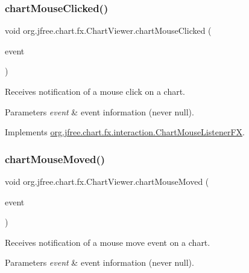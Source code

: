 \subsubsection{\texorpdfstring{chart\+Mouse\+Clicked()}{chartMouseClicked()}}
{\footnotesize\ttfamily void org.\+jfree.\+chart.\+fx.\+Chart\+Viewer.\+chart\+Mouse\+Clicked (\begin{DoxyParamCaption}\item[{\mbox{\hyperlink{classorg_1_1jfree_1_1chart_1_1fx_1_1interaction_1_1_chart_mouse_event_f_x}{Chart\+Mouse\+Event\+FX}}}]{event }\end{DoxyParamCaption})}

Receives notification of a mouse click on a chart.


\begin{DoxyParams}{Parameters}
{\em event} & event information (never {\ttfamily null}). \\
\hline
\end{DoxyParams}


Implements \mbox{\hyperlink{interfaceorg_1_1jfree_1_1chart_1_1fx_1_1interaction_1_1_chart_mouse_listener_f_x_a7953c88563d5cd432d8232f3ade82403}{org.\+jfree.\+chart.\+fx.\+interaction.\+Chart\+Mouse\+Listener\+FX}}.

\mbox{\label{classorg_1_1jfree_1_1chart_1_1fx_1_1_chart_viewer_ad9cb6ad74904822db234d14c8356c05d}} 
\subsubsection{\texorpdfstring{chart\+Mouse\+Moved()}{chartMouseMoved()}}
{\footnotesize\ttfamily void org.\+jfree.\+chart.\+fx.\+Chart\+Viewer.\+chart\+Mouse\+Moved (\begin{DoxyParamCaption}\item[{\mbox{\hyperlink{classorg_1_1jfree_1_1chart_1_1fx_1_1interaction_1_1_chart_mouse_event_f_x}{Chart\+Mouse\+Event\+FX}}}]{event }\end{DoxyParamCaption})}

Receives notification of a mouse move event on a chart.


\begin{DoxyParams}{Parameters}
{\em event} & event information (never {\ttfamily null}). \\
\hline
\end{DoxyParams}



